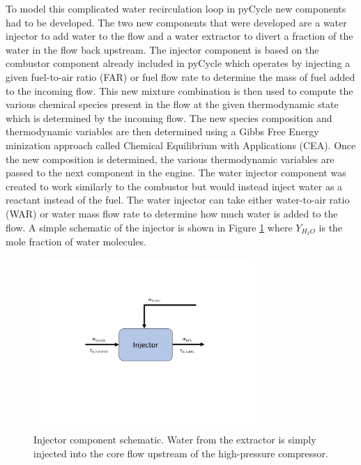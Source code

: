 \documentclass[conf]{new-aiaa}
\begin{document}
\noindent
To model this complicated water recirculation loop in pyCycle new components had to be developed.
The two new components that were developed are a water injector to add water to the flow and a water extractor to divert a fraction of the water in the flow back upstream.
The injector component is based on the combustor component already included in pyCycle which operates by injecting a given fuel-to-air ratio (FAR) or fuel flow rate to determine the mass of fuel added to the incoming flow.
This new mixture combination is then used to compute the various chemical species present in the flow at the given thermodynamic state which is determined by the incoming flow.
The new species composition and thermodynamic variables are then determined using a Gibbs Free Energy minization approach called Chemical Equilibrium with Applications (CEA).
Once the new composition is determined, the various thermodynamic variables are passed to the next component in the engine.
The water injector component was created to work similarly to the combustor but would instead inject water as a reactant instead of the fuel.
The water injector can take either water-to-air ratio (WAR) or water mass flow rate to determine how much water is added to the flow.
A simple schematic of the injector is shown in Figure \ref{fig:injector} where $Y_{H_2O}$ is the mole fraction of water molecules.

\begin{figure}[!hbt]
    \centering
    \includegraphics[width=0.75\textwidth]{injector.pdf}
    \caption{
        Injector component schematic.
        Water from the extractor is simply injected into the core flow upstream of the high-pressure compressor.
    }
    \label{fig:injector}
\end{figure}
\end{document}
